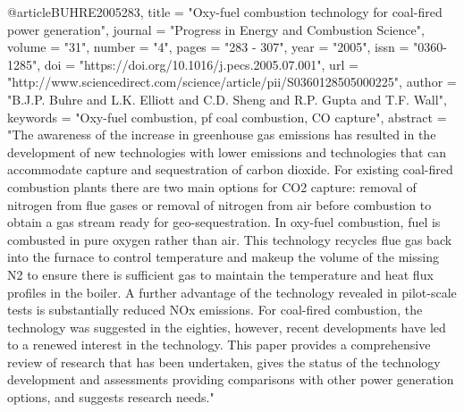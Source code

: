 @article{BUHRE2005283,
	title = "Oxy-fuel combustion technology for coal-fired power generation",
	journal = "Progress in Energy and Combustion Science",
	volume = "31",
	number = "4",
	pages = "283 - 307",
	year = "2005",
	issn = "0360-1285",
	doi = "https://doi.org/10.1016/j.pecs.2005.07.001",
	url = "http://www.sciencedirect.com/science/article/pii/S0360128505000225",
	author = "B.J.P. Buhre and L.K. Elliott and C.D. Sheng and R.P. Gupta and T.F. Wall",
	keywords = "Oxy-fuel combustion, pf coal combustion, CO capture",
	abstract = "The awareness of the increase in greenhouse gas emissions has resulted in the development of new technologies with lower emissions and technologies that can accommodate capture and sequestration of carbon dioxide. For existing coal-fired combustion plants there are two main options for CO2 capture: removal of nitrogen from flue gases or removal of nitrogen from air before combustion to obtain a gas stream ready for geo-sequestration. In oxy-fuel combustion, fuel is combusted in pure oxygen rather than air. This technology recycles flue gas back into the furnace to control temperature and makeup the volume of the missing N2 to ensure there is sufficient gas to maintain the temperature and heat flux profiles in the boiler. A further advantage of the technology revealed in pilot-scale tests is substantially reduced NOx emissions. For coal-fired combustion, the technology was suggested in the eighties, however, recent developments have led to a renewed interest in the technology. This paper provides a comprehensive review of research that has been undertaken, gives the status of the technology development and assessments providing comparisons with other power generation options, and suggests research needs."
}

